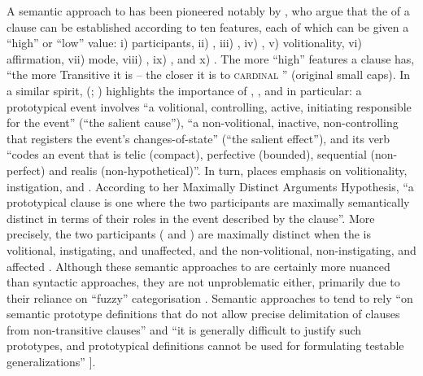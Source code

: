 A semantic approach to  has been pioneered notably by \cite[253]{hopper:thompson:1980}, who argue that the  of a clause can be established according to ten features, each of which can be given a “high” or “low” value: i) participants, ii) , iii) , iv) , v) volitionality, vi) affirmation, vii) mode, viii) , ix) , and x) . The more “high” features a clause has, “the more Transitive it is – the closer it is to \textsc{cardinal} ” (original small caps). In a similar spirit, \citeauthor{givon:2001a} (\citeyear[209]{givon:2001a}; \citeyear[93]{givon:2001b}) highlights the importance of , , and  in particular: a prototypical  event involves “a volitional, controlling, active, initiating  responsible for the event” (“the salient cause”), “a non-volitional, inactive, non-controlling  that registers the event’s changes-of-state” (“the salient effect”), and its verb “codes an event that is telic (compact), perfective (bounded), sequential (non-perfect) and realis (non-hypothetical)”. In turn, \cite[30]{nass:2007} places emphasis on volitionality, instigation, and . According to her Maximally Distinct Arguments Hypothesis, “a prototypical  clause is one where the two participants are maximally semantically distinct in terms of their roles in the event described by the clause”. More precisely, the two participants ( and ) are maximally distinct when the  is volitional, instigating, and unaffected, and the  non-volitional, non-instigating, and affected \citep[44]{nass:2007}. Although these semantic approaches to  are certainly more nuanced than syntactic approaches, they are not unproblematic either, primarily due to their reliance on “fuzzy” categorisation \citep{geeraerts:1989}. Semantic approaches to  tend to rely “on semantic prototype definitions that do not allow precise delimitation of  clauses from non-transitive clauses” \citep[544]{haspelmath:2011a} and “it is generally difficult to justify such prototypes, and prototypical definitions cannot be used for formulating testable generalizations” \citep[313]{haspelmath:2016b}].
 
